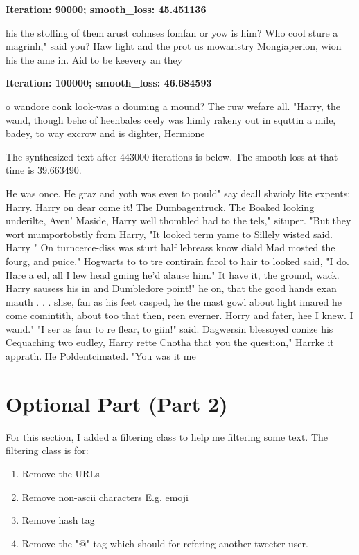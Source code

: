 \documentclass[12pt]{article}
\newenvironment{question}[2][Question]{\begin{trivlist}
\kern10pt
\item[\hskip \labelsep {\bfseries #1}\hskip \labelsep {\bfseries #2.}]}{\end{trivlist}}
\begin{document}
\begin{question}{iii}
\textbf{Iteration: 90000; smooth\_loss: 45.451136}

 his the stolling of them arust colmses fomfan or yow is him?  Who cool sture a magrinh," said you?  Haw light and the prot us mowaristry Mongiaperion, wion his the ame in.  Aid to be keevery an they 


\textbf{Iteration: 100000; smooth\_loss: 46.684593} 

o wandore conk look-was a douming a mound?  The ruw wefare all.  "Harry, the wand, though behc of heenbales ceely was himly rakeny out in squttin a mile, badey, to way excrow and is dighter, Hermione 

\end{question}

\begin{question}{iv}
The synthesized text after 443000 iterations is below. The smooth loss at that time is 39.663490.

He was once.  He graz and yoth was even to pould"  say deall shwioly lite expents; Harry. Harry on dear come it!  The Dumbagentruck.  The Boaked looking underilte, Aven' Maside, Harry well thombled had to the tels," situper.
"But they wort mumportobstly from Harry, "It looked term yame to Sillely wisted said.  Harry "
On turncerce-diss was sturt half lebreass know diald Mad mosted the fourg, and puice."
Hogwarts to to tre contirain farol to hair to looked said, "I do. Hare a ed, all I lew head gming he'd alause him."
It have it, the ground, wack.  Harry sausess his in and Dumbledore point!"  he on, that the good hands exan mauth . . . slise, fan as his feet casped, he the mast gowl about light imared he come comintith, about too that then, reen everner.  Horry and fater, hee I knew.  I wand."
"I ser as faur to re flear, to giin!" said.
Dagwersin blessoyed conize his Cequaching two eudley,
Harry rette Cnotha that you the question,"
Harrke it apprath.  He Poldentcimated.
"You was it me

\end{question}

\section{Optional Part (Part 2)}

For this section, I added a filtering class to help me filtering some text.
The filtering class is for:

\begin{enumerate}
    \item  Remove the URLs
    \item  Remove non-ascii characters E.g. emoji
    \item  Remove hash tag
    \item  Remove the "@" tag which should for refering another tweeter user.
\end{enumerate}
\end{document}

